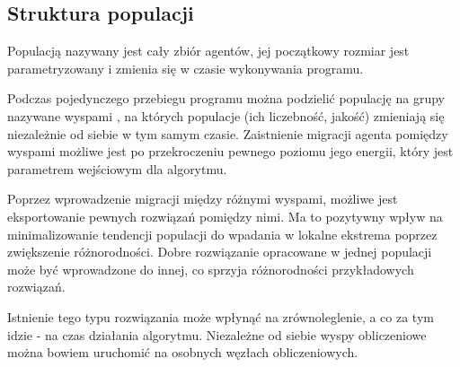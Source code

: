 \subsection*{Struktura populacji}
Populacją nazywany jest cały zbiór agentów, jej początkowy rozmiar jest parametryzowany i zmienia się w czasie wykonywania programu.

Podczas pojedynczego przebiegu programu można podzielić populację na grupy nazywane wyspami \cite{emas3}, na których populacje (ich liczebność, jakość) zmieniają się niezależnie od siebie w tym samym czasie. Zaistnienie migracji agenta pomiędzy wyspami możliwe jest po przekroczeniu pewnego poziomu jego energii, który jest parametrem wejściowym dla algorytmu.

Poprzez wprowadzenie migracji między różnymi wyspami, możliwe jest eksportowanie pewnych rozwiązań pomiędzy nimi. Ma to pozytywny wpływ na minimalizowanie tendencji populacji do wpadania w lokalne ekstrema poprzez zwiększenie różnorodności. Dobre rozwiązanie opracowane w jednej populacji może być wprowadzone do innej, co sprzyja różnorodności przykładowych rozwiązań. 

Istnienie tego typu rozwiązania może wpłynąć na zrównoleglenie, a co za tym idzie - na czas działania algorytmu. Niezależne od siebie wyspy obliczeniowe można bowiem uruchomić na osobnych węzłach obliczeniowych.



